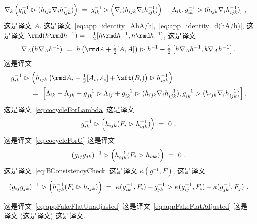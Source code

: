 \documentclass[
    affil-it, %
    auth-lg, %
    british, %
    compression, %
    contents, %
    custom-packages={}, %
    references={bigone}, %
]{lib/preprint}
\begin{document}
\begin{body}
\begin{equation}
\begin{aligned}
                \\
                \nabla_k\left(g^{-1}_{ik}\acton(h_{ijk}\nabla_i h^{-1}_{ijk})\right)\ &=\ g^{-1}_{ik}\acton\left(\nabla_i(h_{ijk}\nabla_i h^{-1}_{ijk})\right)-[\Lambda_{ik},g^{-1}_{ik}\acton(h_{ijk}\nabla_i h^{-1}_{ijk})]~, 
            \end{aligned}
        \end{equation}  这是译文 $A$. 这是译文~\eqref{eq:app_identity_AhA/h},~\eqref{eq:app_identity_d(hA/h)}, 这是译文 $\rmd(h\rmd h^{-1})=-\tfrac12[h\rmd h^{-1},h\rmd h^{-1}]$, 这是译文         \begin{equation}
            \nabla_A(h\nabla_A h^{-1})\ =\ h\left(\rmd A+\tfrac12[A,A]\right)\acton h^{-1}-\tfrac12\left[h\nabla_A h^{-1},h\nabla_A h^{-1}\right].
        \end{equation}  这是译文         \begin{equation}
            \begin{aligned}
                &g^{-1}_{ik}\acton\left(h_{ijk}\left(\rmd A_i+\tfrac12[A_i,A_i]+\sft(B_i)\right)\acton h^{-1}_{ijk}\right)
                \\
                &\kern1cm=\ \left[\Lambda_{ik}-\Lambda_{jk}-g_{jk}^{-1}\acton \Lambda_{ij}+g_{ik}^{-1}\acton(h_{ijk}\nabla_i h_{ijk}^{-1}),g_{ik}^{-1}\acton(h_{ijk}\nabla_i h_{ijk}^{-1})\right].
            \end{aligned}
        \end{equation}  这是译文~\eqref{eq:cocycleForLambda} 这是译文         \begin{equation}\label{eq:appFakeFlatUnadjusted}
            g^{-1}_{ik}\vartriangleright\left(h_{ijk}(F_i\vartriangleright h^{-1}_{ijk})\right)\ =\ 0~.
        \end{equation}  这是译文~\eqref{eq:cocycleForG} 这是译文         \begin{equation}
            (g_{ij}g_{jk})^{-1}\vartriangleright\left(h^{-1}_{ijk}(F_i\vartriangleright h_{ijk})\right)\ =\ 0~.
        \end{equation}  这是译文~\eqref{eq:BConsistencyCheck} 这是译文 $\kappa(g^{-1},F)$, 这是译文         \begin{equation}\label{eq:appFakeFlatAdjusted}
            (g_{ij}g_{jk})^{-1}\acton\left(h^{-1}_{ijk}(F_i\acton h_{ijk})\right)\ =\ \kappa(g^{-1}_{ik},F_i)-g_{jk}^{-1}\acton\kappa(g^{-1}_{ij},F_i)-\kappa(g^{-1}_{jk},F_j)~.
        \end{equation}
        
 这是译文~\eqref{eq:appFakeFlatUnadjusted} 这是译文~\eqref{eq:appFakeFlatAdjusted} 这是译文 (这是译文) 这是译文.
        

\end{body}
\end{document}

